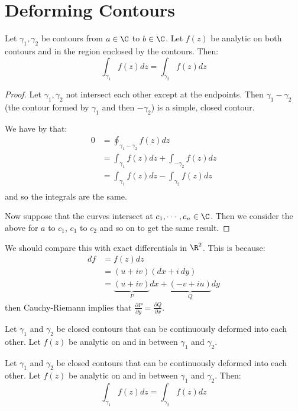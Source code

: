\documentclass[../Main.tex]{subfiles}
\begin{document}
\section{Deforming Contours}
\begin{proposition}
    Let $\gamma_1, \gamma_2$ be contours from $a \in \C$ to $b \in \C$. Let $f(z)$ be analytic on both contours and in the region enclosed by the contours. Then:
    \begin{equation}
        \int_{\gamma_1} f(z) dz = \int_{\gamma_2} f(z) dz
        \label{eqnPathIndep}
    \end{equation}
    \label{propPathIndep}
\end{proposition}
\begin{proof}
    Let $\gamma_1, \gamma_2$ not intersect each other except at the endpoints. Then $\gamma_1 - \gamma_2$ (the contour formed by $\gamma_1$ and then $-\gamma_2$) is a simple, closed contour.
    
    We have by  that:
    \begin{align*}
        0 &= \oint_{\gamma_1 - \gamma_2} f(z) dz \\
        &= \int_{\gamma_1} f(z) dz + \int_{-\gamma_2} f(z) dz \\
        &= \int_{\gamma_1} f(z) dz - \int_{\gamma_2} f(z) dz \\
    \end{align*}
    and so the integrals are the same.

    Now suppose that the curves intersect at $c_1, \cdots, c_n \in \C$. Then we consider the above for $a$ to $c_1$, $c_1$ to $c_2$ and so on to get the same result.
\end{proof}
\begin{remark}
    We should compare this with exact differentials in $\R^2$. This is because:
        \begin{align*}
            df &=f(z) dz \\
            &= (u + i v)(dx + i~dy) \\
            &= \underbrace{(u + iv)}_{P}dx + \underbrace{(-v + i u)}_{Q} dy
        \end{align*}
        then Cauchy-Riemann implies that $\frac{\partial P}{\partial y} = \frac{\partial Q}{\partial x}$.
\end{remark}
Let $\gamma_1$ and $\gamma_2$ be closed contours that can be continuously deformed into each other. Let $f(z)$ be analytic on and in between $\gamma_1$ and $\gamma_2$.
\begin{proposition}
    Let $\gamma_1$ and $\gamma_2$ be closed contours that can be continuously deformed into each other. Let $f(z)$ be analytic on and in between $\gamma_1$ and $\gamma_2$. Then:
    \begin{equation*}
        \int_{\gamma_1} f(z) dz = \int_{\gamma_2} f(z) dz
    \end{equation*}
    \label{propContourShrink}
\end{proposition}
\end{document}
